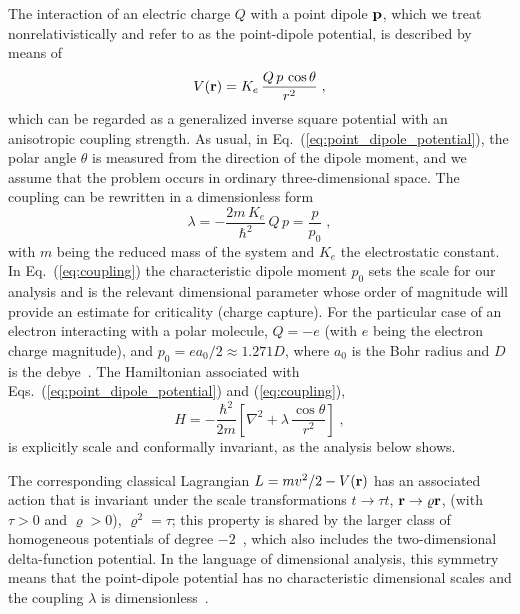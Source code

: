 \documentclass[a4paper,twocolumn,
showpacs,amssymb,aps,prl,superscriptaddress]{revtex4}%
\begin{document}
The interaction of an electric charge $Q$ with a point dipole
${\bf p}$, which we treat nonrelativistically and refer to as the
point-dipole potential, is described by means of
\begin{equation}
V({\bf r})= K_{e} \, \frac{ Q \, p \, \cos \theta}{r^{2}} 
\;  ,
\label{eq:point_dipole_potential}
\end{equation}
which can be regarded as a generalized inverse square potential
with an anisotropic coupling strength. As usual, in
Eq.~(\ref{eq:point_dipole_potential}), the polar angle $\theta$ is
measured from the direction of the dipole moment, and we assume
that the problem occurs in ordinary three-dimensional space. The
coupling can be rewritten in a  dimensionless form
\begin{equation}
\lambda = - \frac{2 m \, K_{e}}{\hbar^{2}}{ \,  Q \, p } =
\frac{p}{p_{0}} 
\; , 
\label{eq:coupling}
\end{equation}
with $m$ being the reduced mass of the system and $K_{e}$ the
electrostatic constant. In Eq.~(\ref{eq:coupling}) the
characteristic dipole moment $p_{0}$ sets the scale for our
analysis and is the relevant dimensional parameter whose order of
magnitude will provide an estimate for criticality (charge
capture). For the particular case of an electron interacting with
a polar molecule, $Q=-e$ (with $e$ being the electron charge magnitude), 
and $p_{0}=e a_{0}/2 \approx 1.271 D$, 
where $a_{0}$ is the Bohr radius and $D $ is the
debye~\cite{debye}. The Hamiltonian associated with
Eqs.~(\ref{eq:point_dipole_potential}) and
(\ref{eq:coupling}),
\begin{equation}
H = - \frac{\hbar^{2}}{2m} \left[
 \nabla^{2}
+ \lambda \, \frac{\cos \theta}{r^{2}}
\right]
\; ,
\label{eq:Hamiltonian}
\end{equation}
is explicitly scale and conformally invariant,
as the analysis below shows.

The corresponding classical Lagrangian $L = m v^{2}/2
 - V({\bf r})
 $ has an associated action that is
  invariant under the scale
transformations $t \rightarrow \tau t$, ${\bf r} \rightarrow
\varrho {\bf r}$, (with $\tau>0$ and $\varrho>0$), $\varrho^{2}=
\tau$; this property is shared by the larger class of homogeneous
potentials of degree $-2$~\cite{cam:00b}, which also includes the
two-dimensional delta-function potential. In the language of
dimensional analysis, this symmetry means that the point-dipole
potential has no characteristic dimensional scales and the
coupling $\lambda$ is dimensionless~\cite{self-adjointness}.
\end{document}

